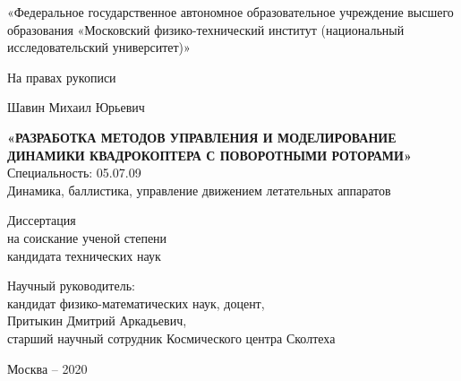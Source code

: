 \thispagestyle{empty}
\begin{comment} 
«Федеральное государственное бюджетное образовательное\\
учреждение высшего образования \\
«Московский авиационный институт \\
(национальный исследовательский университет)»
\end{comment}

\begin{center} 
«Федеральное государственное автономное образовательное учреждение высшего образования «Московский физико-технический институт (национальный исследовательский университет)»
\end{center}

{
\vskip 5mm
}

\begin{flushright}
На правах рукописи
\end{flushright}


{
   	\vskip 12mm
}

\begin{center}
	Шавин Михаил Юрьевич
\end{center}
\begin{center} 
	\textbf{«РАЗРАБОТКА МЕТОДОВ УПРАВЛЕНИЯ И МОДЕЛИРОВАНИЕ ДИНАМИКИ КВАДРОКОПТЕРА С ПОВОРОТНЫМИ РОТОРАМИ»} \\
	Специальность: 05.07.09 \\
	Динамика, баллистика, управление движением летательных аппаратов
\end{center}

{
	\vskip 6mm
}

\begin{center} 
	Диссертация \\
	на соискание ученой степени \\
	кандидата технических наук
\end{center}


{
	\vskip 12mm
}

\begin{center} 
Научный руководитель: \\
кандидат физико-математических наук, доцент, \\ 
Притыкин Дмитрий Аркадьевич, \\
старший научный сотрудник Космического центра Сколтеха \\
\vspace{5mm}
\end{center}

{
	\vskip 8mm
}

\begin{center} 
Москва -- 2020
\end{center}

